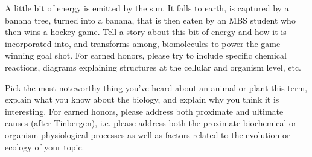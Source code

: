 A little bit of energy is emitted by the sun. It falls to earth, is captured by a banana tree, turned into a banana, that is then eaten by an MBS student who then wins a hockey game. Tell a story about this bit of energy and how it is incorporated into, and transforms among, biomolecules to power the game winning goal shot. For earned honors, please try to include specific chemical reactions, diagrams explaining structures at the cellular and organism level, etc. 

Pick the most noteworthy thing you've heard about an animal or plant this term, explain what you know about the biology, and explain why you think it is interesting. For earned honors, please address both proximate and ultimate causes (after Tinbergen), i.e. please address both the proximate biochemical or organism physiological processes as well as factors related to the evolution or ecology of your topic. 